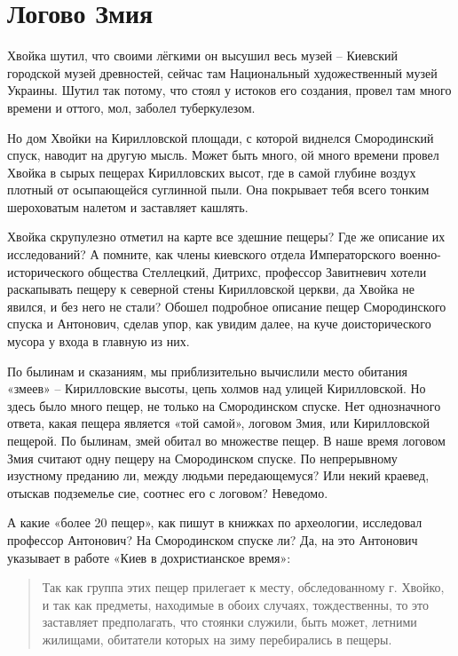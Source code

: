 \chapter{Логово Змия}

Хвойка шутил, что своими лёгкими он высушил весь музей – Киевский городской музей древностей, сейчас там Национальный художественный музей Украины. Шутил так потому, что стоял у истоков его создания, провел там много времени и оттого, мол, заболел туберкулезом.

Но дом Хвойки на Кирилловской площади, с которой виднелся Смородинский спуск, наводит на другую мысль. Может быть много, ой много времени провел Хвойка в сырых пещерах Кирилловских высот, где в самой глубине воздух плотный от осыпающейся суглинной пыли. Она покрывает тебя всего тонким шероховатым налетом и заставляет кашлять.

Хвойка скрупулезно отметил на карте все здешние пещеры? Где же описание их исследований? А помните, как члены киевского отдела Императорского военно-исторического общества Стеллецкий, Дитрихс, профессор Завитневич хотели раскапывать пещеру к северной стены Кирилловской церкви, да Хвойка не явился, и без него не стали? Обошел подробное описание пещер Смородинского спуска и Антонович, сделав упор, как увидим далее, на куче доисторического мусора у входа в главную из них.

По былинам и сказаниям, мы приблизительно вычислили место обитания «змеев» – Кирилловские высоты, цепь холмов над улицей Кирилловской. Но здесь было много пещер, не только на Смородинском спуске. Нет однозначного ответа, какая пещера является «той самой», логовом Змия, или Кирилловской пещерой. По былинам, змей обитал во множестве пещер. В наше время логовом Змия считают одну пещеру на Смородинском спуске. По непрерывному изустному преданию ли, между людьми передающемуся? Или некий краевед, отыскав подземелье сие, соотнес его с логовом? Неведомо.

А какие «более 20 пещер», как пишут в книжках по археологии, исследовал профессор Антонович? На Смородинском спуске ли? Да, на это Антонович указывает в работе «Киев в дохристианское время»\cite{antpublect01}:

\begin{quotation}
Так как группа этих пещер прилегает к месту, обследованному г. Хвойко, и так как предметы, находимые в обоих случаях, тождественны, то это заставляет предполагать, что стоянки служили, быть может, летними жилищами, обитатели которых на зиму перебирались в пещеры.
\end{quotation}

